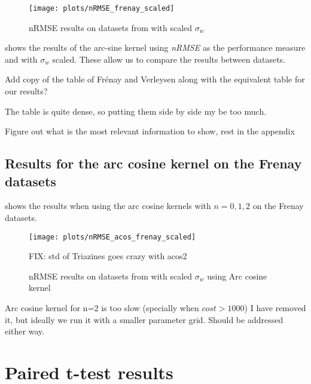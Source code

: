 \begin{figure}[H]
    \texttt{[image: plots/nRMSE\_frenay\_scaled]}
    \caption{nRMSE results on datasets from \cite{frenayParameterinsensitiveKernelExtreme2011} with
        scaled $\sigma_w$}%
    \label{fig:nrmse-frenay-scaled}
\end{figure}

 shows the results of the arc-sine kernel using
\emph{nRMSE} as the performance measure and with $\sigma_w$ scaled. These allow
us to compare the results between datasets.

\begin{cnote}
    Add copy of the table of Frénay and Verleysen along with the equivalent
    table for our results?

    The table is quite dense, so putting them side by side my be too much.

    Figure out what is the most relevant information to show, rest in the
    appendix
\end{cnote}

\subsection{Results for the arc cosine kernel on the Frenay datasets}

 shows the results when using the arc cosine kernels
with $n=0,1,2$ on the Frenay datasets.

\begin{figure}[H]
    \texttt{[image: plots/nRMSE\_acos\_frenay\_scaled]}
    \begin{cnote}
        FIX: std of Triazines goes crazy with acos2
    \end{cnote}
    \caption{nRMSE results on datasets from \cite{frenayParameterinsensitiveKernelExtreme2011} with
        scaled $\sigma_w$ using Arc cosine kernel}%
    \label{fig:nrmse-acos-frenay-scaled}
\end{figure}

\begin{cnote}
    Arc cosine kernel for n=2 is too slow (specially when $cost>1000$)
    I have removed it, but ideally we run it with a smaller parameter grid.
    Should be addressed either way.
\end{cnote}

\section{Paired t-test results}

